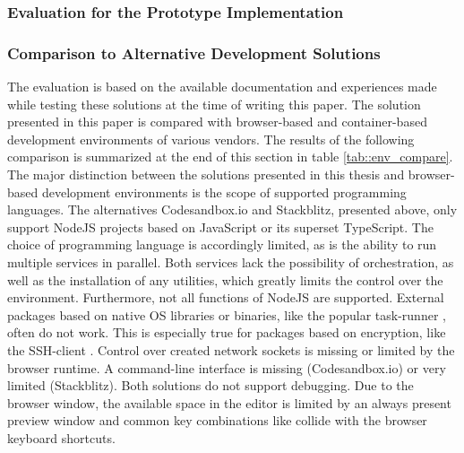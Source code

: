 \subsubsection{Evaluation for the Prototype Implementation}



\subsubsection{Comparison to Alternative Development Solutions}
The evaluation is based on the available documentation and experiences made while testing these solutions at the time of writing this paper. The solution presented in this paper is compared with browser-based and container-based development environments of various vendors. The results of the following comparison is summarized at the end of this section in table \ref{tab::env_compare}.
The major distinction between the solutions presented in this thesis and browser-based development environments is the scope of supported programming languages. The alternatives Codesandbox.io and Stackblitz, presented above, only support NodeJS projects based on JavaScript or its superset TypeScript. The choice of programming language is accordingly limited, as is the ability to run multiple services in parallel. Both services lack the possibility of orchestration, as well as the installation of any utilities, which greatly limits the control over the environment. \newline
Furthermore, not all functions of NodeJS are supported. External packages based on native \acl{OS} libraries or binaries, like the popular task-runner , often do not work. This is especially true for packages based on encryption, like the \ac{SSH}-client . Control over created network sockets is missing or limited by the browser runtime. A command-line interface is missing (Codesandbox.io) or very limited (Stackblitz). Both solutions do not support debugging. Due to the browser window, the available space in the editor is limited by an always present preview window and common key combinations like  collide with the browser keyboard shortcuts.\newline
